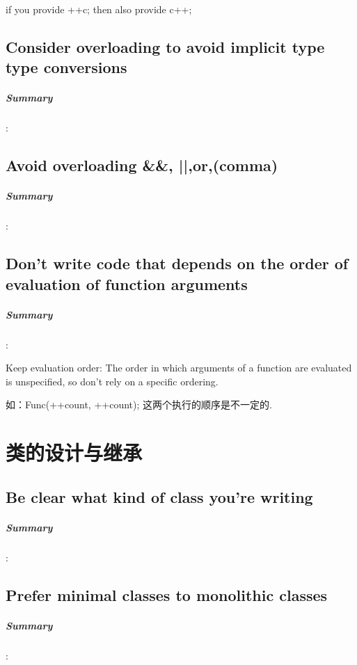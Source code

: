 \documentclass[UTF8,a4paper,12pt]{ctexbook}
\begin{document}
		if you provide ++c; then also provide c++;
	\section{Consider overloading to avoid implicit type type conversions}
		\paragraph{Summary}:
		
		
	\section{Avoid overloading \&\&, ||,or,(comma)}
		\paragraph{Summary}:
		
		
	\section{Don't write code that depends on the order of evaluation of function arguments}
		\paragraph{Summary}:
		
		Keep evaluation order: The order in which arguments of a function are evaluated is unspecified, so don't rely on a specific ordering.
		
		如：Func(++count, ++count); 这两个执行的顺序是不一定的.
\chapter{类的设计与继承}
	\section{Be clear what kind of class you're writing}
		\paragraph{Summary}:
		
		
	\section{Prefer minimal classes to monolithic classes}
		\paragraph{Summary}:
		
\end{document}
